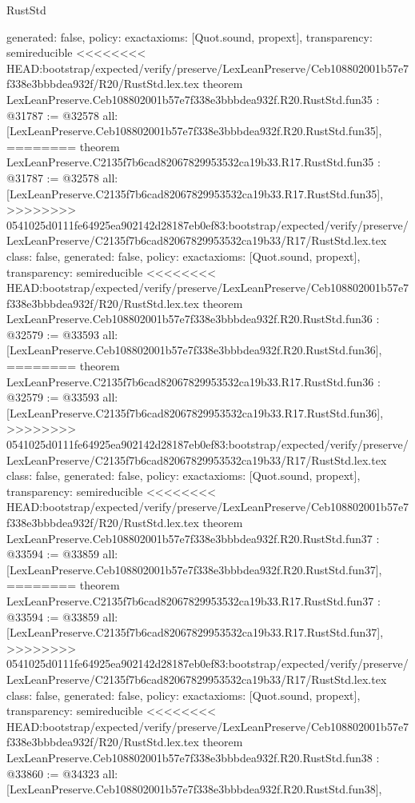 \begin{lexlean}{RustStd}
\begin{coremodule}
{\begin{coremodule}
{{{{{{{{{{{{{{{{{{{{{{{{{{{{{{{{{{{{{{  generated: false,
  policy: exact{axioms: [Quot.sound, propext]},
  transparency: semireducible
}
<<<<<<<< HEAD:bootstrap/expected/verify/preserve/LexLeanPreserve/Ceb108802001b57e7f338e3bbbdea932f/R20/RustStd.lex.tex
theorem LexLeanPreserve.Ceb108802001b57e7f338e3bbbdea932f.R20.RustStd.fun35 : @31787 := @32578 {
  all: [LexLeanPreserve.Ceb108802001b57e7f338e3bbbdea932f.R20.RustStd.fun35],
========
theorem LexLeanPreserve.C2135f7b6cad82067829953532ca19b33.R17.RustStd.fun35 : @31787 := @32578 {
  all: [LexLeanPreserve.C2135f7b6cad82067829953532ca19b33.R17.RustStd.fun35],
>>>>>>>> 0541025d0111fe64925ea902142d28187eb0ef83:bootstrap/expected/verify/preserve/LexLeanPreserve/C2135f7b6cad82067829953532ca19b33/R17/RustStd.lex.tex
  class: false,
  generated: false,
  policy: exact{axioms: [Quot.sound, propext]},
  transparency: semireducible
}
<<<<<<<< HEAD:bootstrap/expected/verify/preserve/LexLeanPreserve/Ceb108802001b57e7f338e3bbbdea932f/R20/RustStd.lex.tex
theorem LexLeanPreserve.Ceb108802001b57e7f338e3bbbdea932f.R20.RustStd.fun36 : @32579 := @33593 {
  all: [LexLeanPreserve.Ceb108802001b57e7f338e3bbbdea932f.R20.RustStd.fun36],
========
theorem LexLeanPreserve.C2135f7b6cad82067829953532ca19b33.R17.RustStd.fun36 : @32579 := @33593 {
  all: [LexLeanPreserve.C2135f7b6cad82067829953532ca19b33.R17.RustStd.fun36],
>>>>>>>> 0541025d0111fe64925ea902142d28187eb0ef83:bootstrap/expected/verify/preserve/LexLeanPreserve/C2135f7b6cad82067829953532ca19b33/R17/RustStd.lex.tex
  class: false,
  generated: false,
  policy: exact{axioms: [Quot.sound, propext]},
  transparency: semireducible
}
<<<<<<<< HEAD:bootstrap/expected/verify/preserve/LexLeanPreserve/Ceb108802001b57e7f338e3bbbdea932f/R20/RustStd.lex.tex
theorem LexLeanPreserve.Ceb108802001b57e7f338e3bbbdea932f.R20.RustStd.fun37 : @33594 := @33859 {
  all: [LexLeanPreserve.Ceb108802001b57e7f338e3bbbdea932f.R20.RustStd.fun37],
========
theorem LexLeanPreserve.C2135f7b6cad82067829953532ca19b33.R17.RustStd.fun37 : @33594 := @33859 {
  all: [LexLeanPreserve.C2135f7b6cad82067829953532ca19b33.R17.RustStd.fun37],
>>>>>>>> 0541025d0111fe64925ea902142d28187eb0ef83:bootstrap/expected/verify/preserve/LexLeanPreserve/C2135f7b6cad82067829953532ca19b33/R17/RustStd.lex.tex
  class: false,
  generated: false,
  policy: exact{axioms: [Quot.sound, propext]},
  transparency: semireducible
}
<<<<<<<< HEAD:bootstrap/expected/verify/preserve/LexLeanPreserve/Ceb108802001b57e7f338e3bbbdea932f/R20/RustStd.lex.tex
theorem LexLeanPreserve.Ceb108802001b57e7f338e3bbbdea932f.R20.RustStd.fun38 : @33860 := @34323 {
  all: [LexLeanPreserve.Ceb108802001b57e7f338e3bbbdea932f.R20.RustStd.fun38],
}}}}}}}}}}}}}}}}}}}}}}}}}}}}}}}}}}}}}}}}}
\end{coremodule}}
\end{coremodule}
\end{lexlean}
